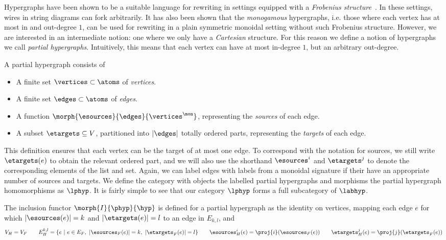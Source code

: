 \documentclass[10pt]{article}
\begin{document}
Hypergraphs have been shown to be a suitable language for rewriting in settings equipped with a \emph{Frobenius structure}~\cite{bonchi2016rewriting}.
In these settings, wires in string diagrams can fork arbitrarily.
It has also been shown that the \emph{monogamous} hypergraphs, i.e. those where each vertex has at most in and out-degree $1$, can be used for rewriting in a plain symmetric monoidal setting without such Frobenius structure.
However, we are interested in an intermediate notion: one where we only have a \emph{Cartesian} structure.
For this reason we define a notion of hypergraphs we call \emph{partial hypergraphs}.
Intuitively, this means that each vertex can have at most in-degree $1$, but an arbitrary out-degree.

\begin{definition}
    A partial hypergraph consists of
    \begin{itemize}
        \item A finite set $\vertices \subset \atoms$ of \emph{vertices}.
        \item A finite set $\edges \subset \atoms$ of \emph{edges}.
        \item A function $\morph{\esources}{\edges}{\vertices^\mon}$, representing the \emph{sources} of each edge. 
        \item A subset $\etargets \subseteq V$, partitioned into $|\edges|$ totally ordered parts, representing the \emph{targets} of each edge.
    \end{itemize}
\end{definition}

This definition ensures that each vertex can be the target of at most one edge.
To correspond with the notation for sources, we still write $\etargets(e)$ to obtain the relevant ordered part, and we will also use the shorthand $\esources^i$ and $\etargets^j$ to denote the corresponding elements of the list and set.
Again, we can label edges with labels from a monoidal signature if their have an appropriate number of sources and targets. 
We define the category with objects the labelled partial hypergraphs and morphisms the partial hypergraph homomorphisms as $\lphyp$.
It is fairly simple to see that our category $\lphyp$ forms a full subcategory of $\labhyp$.

\begin{definition}
    The inclusion functor $\morph{I}{\phyp}{\hyp}$ is defined for a partial hypergraph as the identity on vertices, mapping each edge $e$ for which $|\esources(e)| = k$ and $|\etargets(e)| = l$ to an edge in $E_{k,l}$, and 
    \begin{gather*}
        V_H = V_F \qquad 
        E^{k,l}_H = \{ e \ |\ e \in E_F,\ |\esources_F(e)| = k,\ |\etargets_F(e)| = l\} \qquad
        \esources_H^i(e) = \proj{i}(\esources_F(e)) \qquad
        \etargets_H^j(e) = \proj{j}(\etargets_F(e))
    \end{gather*}
\end{definition}
\end{document}
